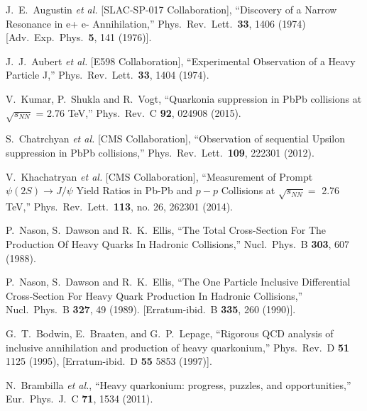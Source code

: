 \documentclass[aps,prc,preprint,superscriptaddress,showpacs,showkeys,amsmath]{revtex4-1}
\begin{document}
\noindent
\begin{thebibliography}{100}
\medskip

  J.~E.~Augustin {\it et al.} [SLAC-SP-017 Collaboration],
  ``Discovery of a Narrow Resonance in e+ e- Annihilation,''
  Phys.\ Rev.\ Lett.\  {\bf 33}, 1406 (1974)
  [Adv.\ Exp.\ Phys.\  {\bf 5}, 141 (1976)].

  J.~J.~Aubert {\it et al.} [E598 Collaboration],
  ``Experimental Observation of a Heavy Particle J,''
  Phys.\ Rev.\ Lett.\  {\bf 33}, 1404 (1974).
  

  V.~Kumar, P.~Shukla and R.~Vogt,
  ``Quarkonia suppression in PbPb collisions at $\sqrt{s_{NN}}$ = 2.76 TeV,''
  Phys.\ Rev.\ C {\bf 92}, 024908 (2015).


  S.~Chatrchyan {\it et al.} [CMS Collaboration],
  ``Observation of sequential Upsilon suppression in PbPb collisions,''
  Phys.\ Rev.\ Lett.\  {\bf 109}, 222301 (2012).


  V.~Khachatryan {\it et al.} [CMS Collaboration],
  ``Measurement of Prompt $\psi(2S) \to J/\psi$ Yield Ratios in Pb-Pb and $p-p$ Collisions at $\sqrt {s_{NN}}=$ 2.76  TeV,''
  Phys.\ Rev.\ Lett.\  {\bf 113}, no. 26, 262301 (2014).


  P.~Nason, S.~Dawson and R.~K.~Ellis,
  ``The Total Cross-Section For The Production Of Heavy Quarks In Hadronic Collisions,''
  Nucl.\ Phys.\ B {\bf 303}, 607 (1988).
  
  P.~Nason, S.~Dawson and R.~K.~Ellis,
  ``The One Particle Inclusive Differential Cross-Section For Heavy Quark Production In Hadronic Collisions,''
  Nucl.\ Phys.\ B {\bf 327}, 49 (1989).
  [Erratum-ibid.\ B {\bf 335}, 260 (1990)].

G.~T.~Bodwin, E.~Braaten, and G.~P.~Lepage,
``Rigorous QCD analysis of inclusive annihilation and production of heavy
quarkonium,''
Phys.\ Rev.\ D {\bf 51} 1125 (1995), 
[Erratum-ibid.\ D {\bf 55} 5853 (1997)].



  N.~Brambilla {\it et al.},
  ``Heavy quarkonium: progress, puzzles, and opportunities,''
  Eur.\ Phys.\ J.\ C {\bf 71}, 1534 (2011).



\end{thebibliography}
\end{document}

